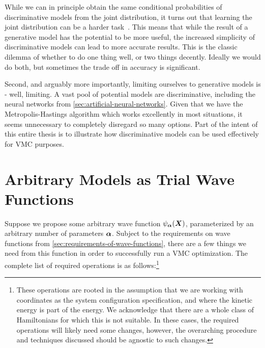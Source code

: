 \documentclass[Thesis.tex]{subfiles}
\begin{document}
While we can in principle obtain the same conditional probabilities of
discriminative models from the joint distribution, it turns out that learning
the joint distribution can be a harder task~\cite{Ng-2001}. This means that
while the result of a generative model has the potential to be more useful, the
increased simplicity of discriminative models can lead to more accurate results.
This is the classic dilemma of whether to do one thing well, or two things
decently. Ideally we would do both, but sometimes the trade off in accuracy is
significant.

Second, and arguably more importantly, limiting ourselves to generative models
is - well, limiting. A vast pool of potential models are discriminative,
including the neural networks from \cref{sec:artificial-neural-networks}. Given
that we have the Metropolis-Hastings algorithm which works excellently in 
most situations, it seems unnecessary to completely disregard so many options.
Part of the intent of this entire thesis is to illustrate how discriminative
models can be used effectively for VMC purposes.


\section{Arbitrary Models as Trial Wave Functions}
\label{sec:arbitrary-models-as-trial-wave-functions}

Suppose we propose some arbitrary wave function $\psi_{\bm{\alpha}}(\bm{X})$, parameterized
by an arbitrary number of parameters $\bm{\alpha}$. Subject to the
requirements on wave functions from \cref{sec:requirements-of-wave-functions},
there are a few things we need from this function in order to successfully run a
VMC optimization. The complete list of required operations is as
follows:\footnote{These operations are rooted in the assumption that we are
  working with coordinates as the system configuration specification, and where
  the kinetic energy is part of the energy. We acknowledge that there are a
  whole class of Hamiltonians for which this is not suitable. In these cases,
  the required operations will likely need some changes, however, the overarching
  procedure and techniques discussed should be agnostic to such changes.}
\end{document}
